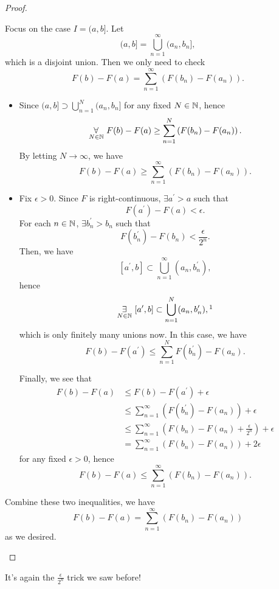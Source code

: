 \begin{proof}
\begin{enumerate}
		      Focus on the case \(I = (a, b]\). Let
		      \[
			      (a, b] = \bigcup\limits_{n=1}^{\infty} (a_{n}, b_{n}],
		      \]
		      which is a disjoint union. Then we only need to check
		      \[
			      F(b) - F(a) = \sum\limits_{n=1}^{\infty} \left(F(b_{n}) - F(a_{n})\right).
		      \]
		      \begin{itemize}
			      \item Since \((a, b]\supset \bigcup\limits_{n=1}^{N} (a_{n}, b_{n}]\) for any fixed \(N\in\mathbb{\MakeUppercase{N}} \), hence
			            \[
				            \underset{N\in\mathbb{\MakeUppercase{N}} }{\forall}\ F(b) - F(a) \geq \sum\limits_{n=1}^{N} \left(F(b_{n}) - F(a_{n})\right).
			            \]
			            By letting \(N \to \infty\), we have
			            \[
				            F(b) - F(a) \geq \sum\limits_{n=1}^{\infty} \left(F(b_{n}) - F(a_{n})\right).
			            \]
			      \item Fix \(\epsilon >0\). Since \(F\) is right-continuous, \(\exists a ^\prime > a\) such that
			            \[
				            F(a ^\prime ) - F(a) <\epsilon.
			            \]
			            For each \(n\in\mathbb{\MakeUppercase{N}} \), \(\exists b_{n} ^\prime > b_{n}\) such that
			            \[
				            F(b_{n} ^\prime ) - F(b_{n})<\frac{\epsilon }{2^n}.
			            \]
			            Then, we have
			            \[
				            [a ^\prime , b] \subset \bigcup\limits_{n=1}^{\infty} (a_{n}, b_{n} ^\prime ),
			            \]
			            hence
			            \[
				            \underset{ N\in\mathbb{\MakeUppercase{N}}}{\exists}\ [a ^\prime , b]\subset \bigcup\limits_{n=1}^{N} (a_{n}, b_{n} ^\prime ),\footnotemark
			            \]
			            which is only finitely many unions now. In this case, we have
			            \[
				            F(b) - F(a ^\prime ) \leq \sum\limits_{n=1}^{N} F(b_{n} ^\prime ) - F(a_{n}).
			            \]

			            Finally, we see that
			            \[
				            \begin{split}
					            F(b) - F(a)&\leq F(b) - F(a ^\prime )+\epsilon \\
					            &\leq \sum\limits_{n=1}^{\infty} \left(F(b_{n} ^\prime ) - F(a_{n})\right) + \epsilon \\
					            &\leq \sum\limits_{n=1}^{\infty} \left(F(b_{n}) - F(a_{n}) + \frac{\epsilon }{2^n}\right) + \epsilon\\
					            &= \sum\limits_{n=1}^{\infty} \left(F(b_{n}) - F(a_{n})\right) + 2\epsilon
				            \end{split}
			            \]
			            for any fixed \(\epsilon > 0\), hence
			            \[
				            F(b) - F(a) \leq \sum\limits_{n=1}^{\infty} (F(b_{n}) - F(a_{n})).
			            \]
		      \end{itemize}
		      Combine these two inequalities, we have
		      \[
			      F(b) - F(a) = \sum\limits_{n=1}^{\infty} (F(b_{n}) - F(a_{n}))
		      \]
		      as we desired.
	\end{enumerate}
\end{proof}
\begin{remark}
	It's again the \(\frac{\epsilon}{2^n}\) trick we saw before!
\end{remark}
